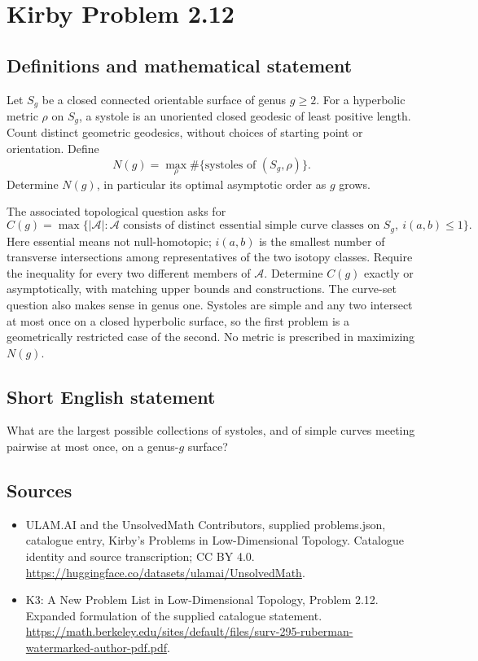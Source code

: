 \documentclass[11pt,a4paper]{article}
\begin{document}
\section*{Kirby Problem 2.12}\label{statement}

\subsection{Definitions and mathematical statement}
Let $S_g$ be a closed connected orientable surface of genus $g\geq2$. For a
hyperbolic metric $\rho$ on $S_g$, a systole is an unoriented closed geodesic
of least positive length. Count distinct geometric geodesics, without choices
of starting point or orientation. Define
\[
N(g)=\max_{\rho}\#\{\text{systoles of }(S_g,\rho)\}.
\]
Determine $N(g)$, in particular its optimal asymptotic order as $g$ grows.

The associated topological question asks for
\[
C(g)=\max\{|\mathcal A|: \mathcal A\text{ consists of distinct essential
simple curve classes on }S_g,\ i(a,b)\leq1\}.
\]
Here essential means not null-homotopic; $i(a,b)$ is the smallest number of
transverse intersections among representatives of the two isotopy classes.
Require the inequality for every two different members of $\mathcal A$.
Determine $C(g)$ exactly or asymptotically, with matching upper bounds and
constructions. The curve-set question also makes sense in genus one.
Systoles are simple and any two intersect at most once on a closed hyperbolic
surface, so the first problem is a geometrically restricted case of the second.
No metric is prescribed in maximizing $N(g)$.
\subsection{Short English statement}
What are the largest possible collections of systoles, and of simple curves meeting pairwise at most once, on a genus-$g$ surface?
\subsection{Sources}
\begin{itemize}
\item[S1] ULAM.AI and the UnsolvedMath Contributors, supplied problems.json, catalogue entry, Kirby's Problems in Low-Dimensional Topology. Catalogue identity and source transcription; CC BY 4.0.
\url{https://huggingface.co/datasets/ulamai/UnsolvedMath}.
\item[S2] K3: A New Problem List in Low-Dimensional Topology, Problem 2.12. Expanded formulation of the supplied catalogue statement.
\url{https://math.berkeley.edu/sites/default/files/surv-295-ruberman-watermarked-author-pdf.pdf}.
\end{itemize}
\end{document}
